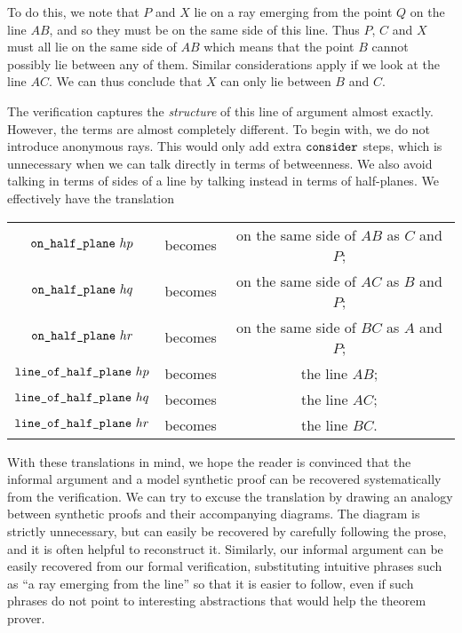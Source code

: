 To do this, we note that $P$ and $X$ lie on a ray emerging from the point $Q$ on the line $AB$, and so they must be on the same side of this line. Thus $P$, $C$ and $X$ must all lie on the same side of $AB$ which means that the point $B$ cannot possibly lie between any of them. Similar considerations apply if we look at the line $AC$. We can thus conclude that $X$ can only lie between $B$ and $C$.

The verification captures the \emph{structure} of this line of argument almost exactly. However, the terms are almost completely different. To begin with, we do not introduce anonymous rays. This would only add extra $\texttt{consider}$ steps, which is unnecessary when we can talk directly in terms of betweenness. We also avoid talking in terms of sides of a line by talking instead in terms of half-planes. We effectively have the translation

\label{sec:HalfPlaneTranslations}
\begin{tabular}{ccc}
  $\texttt{on\_half\_plane}\ hp$ & becomes & on the same side of $AB$ as $C$ and $P$;\\
  $\texttt{on\_half\_plane}\ hq$ & becomes & on the same side of $AC$ as $B$ and $P$;\\
  $\texttt{on\_half\_plane}\ hr$ & becomes & on the same side of $BC$ as $A$ and $P$;\\
  $\texttt{line\_of\_half\_plane}\ hp$ & becomes & the line $AB$; \\
  $\texttt{line\_of\_half\_plane}\ hq$ & becomes & the line $AC$; \\ 
  $\texttt{line\_of\_half\_plane}\ hr$ & becomes & the line $BC$. \\
\end{tabular}\linebreak

With these translations in mind, we hope the reader is convinced that the informal argument and a model synthetic proof can be recovered systematically from the verification. We can try to excuse the translation by drawing an analogy between synthetic proofs and their accompanying diagrams. The diagram is strictly unnecessary, but can  easily be recovered by carefully following the prose, and it is often helpful to reconstruct it. Similarly, our informal argument can be easily recovered from our formal verification, substituting intuitive phrases such as ``a ray emerging from the line'' so that it is easier to follow, even if such phrases do not point to interesting abstractions that would help the theorem prover.

